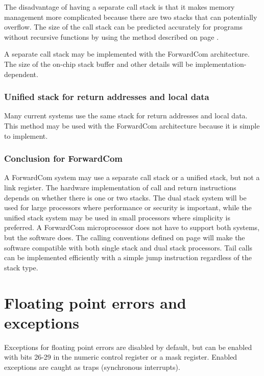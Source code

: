 \documentclass[forwardcom.tex]{subfiles}
\begin{document}
The disadvantage of having a separate call stack is that it makes memory management more complicated because there are two stacks that can potentially overflow. The size of the call stack can be predicted accurately for programs without recursive functions by using the method described on page \pageref{predictingStackSize}.
\vspace{2mm}

A separate call stack may be implemented with the ForwardCom architecture. The size of the on-chip stack buffer and other details will be implementation-dependent.

\subsubsection{Unified stack for return addresses and local data} \label{singleStack}
Many current systems use the same stack for return addresses and local data. This method may be used with the ForwardCom architecture because it is simple to implement. 

\subsubsection{Conclusion for ForwardCom}
A ForwardCom system may use a separate call stack or a unified stack, but not a link register. The hardware implementation of call and return instructions depends on whether there is one or two stacks. The dual stack system will be used for large processors where performance or security is important, while the unified stack system may be used in small processors where simplicity is preferred. A ForwardCom microprocessor does not have to support both systems, but the software does. 
The calling conventions defined on page \pageref{functionCallingConventions} will make the software compatible with both single stack and dual stack processors.
Tail calls can be implemented efficiently with a simple jump instruction regardless of the stack type.
\vspace{2mm}

\section{Floating point errors and exceptions}
Exceptions for floating point errors are disabled by default, but can be enabled with bits 26-29 in the numeric control register or a mask register. Enabled exceptions are caught as traps (synchronous interrupts).
\vspace{2mm}
\end{document}
